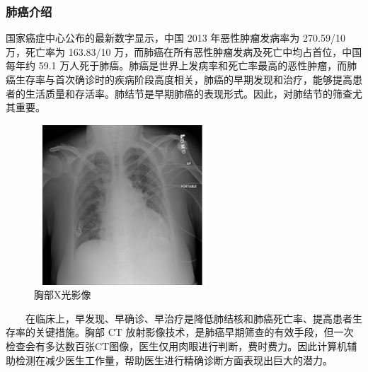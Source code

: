 \documentclass{xcumcmart}
\begin{document}
\subsubsection{肺癌介绍}
国家癌症中心公布的最新数字显示，中国 2013 年恶性肿瘤发病率为 270.59/10 万，死亡率为 163.83/10 万，而肺癌在所有恶性肿瘤发病及死亡中均占首位，中国每年约 59.1 万人死于肺癌。肺癌是世界上发病率和死亡率最高的恶性肿瘤，而肺癌生存率与首次确诊时的疾病阶段高度相关，肺癌的早期发现和治疗，能够提高患者的生活质量和存活率。肺结节是早期肺癌的表现形式。因此，对肺结节的筛查尤其重要。
\begin{figure}[htbp]
        \centering
        \includegraphics[width=0.6\textwidth,height=6cm]{fig/2.png}
        \caption{胸部X光影像\label{fig:alpy.jpeg}}
\end{figure}
  在临床上，早发现、早确诊、早治疗是降低肺结核和肺癌死亡率、提高患者生存率的关键措施。胸部 CT 放射影像技术，是肺癌早期筛查的有效手段，但一次检查会有多达数百张CT图像，医生仅用肉眼进行判断，费时费力。因此计算机辅助检测在减少医生工作量，帮助医生进行精确诊断方面表现出巨大的潜力。
\end{document}
